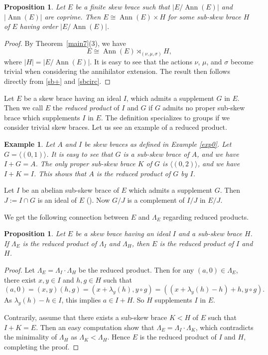 \documentclass[11pt]{amsart}
\theoremstyle{thrm}
\theoremstyle{plain}
\newtheorem{prop}[thm]{Proposition}
\newtheorem{example}[thm]{Example}
\theoremstyle{definition}
\newcommand{\Ann}{\operatorname{Ann} }
\numberwithin{equation}{section}
\begin{document}
\begin{prop}
	Let $E$ be a finite skew brace such that $|E / \Ann(E)|$ and $|\Ann(E)|$ are coprime. Then $E \cong \Ann(E) \times H$
	for some sub-skew brace $H$ of $E$ having order $|E / \Ann(E)|$.
\end{prop}

\begin{proof}
	By Theorem~\ref{main7}(3), we have 
	\[
	E \cong \Ann(E) \rtimes_{(\nu, \mu, \sigma)} H,
	\] 
	where $|H| = |E / \Ann(E)|$. It is easy to see that the actions $\nu$, $\mu$, and $\sigma$ become trivial when considering the annihilator extension. The result then follows directly from  \eqref{sb+} and \eqref{sbcirc}.
\end{proof}


Let $E$ be a skew brace having an ideal $I$, which admits a supplement $G$ in $E$.   Then we call $E$ the {\it reduced product} of $I$ and  $G$ if $G$ admits no proper sub-skew brace which supplements $I$ in $E$. The definition specializes to groups if we consider trivial skew braces.  Let us see an example of a reduced product. 
\begin{example}\label{exp1}
	Let $A$ and $I$  be skew braces  as defined in Example \ref{exp0}. Let $G = \langle (0,1) \rangle$. It is easy to see that $G$ is a sub-skew brace of $A$, and we have $I + G = A$. The only proper sub-skew brace $K$ of $G$ is $  \langle (0,2) \rangle$, and we have $I + K = I$. This shows that $A$ is the reduced product of $G$ by $I$.
\end{example}

Let $I$ be an abelian sub-skew brace of $E$ which admits a supplement $G$. Then $J := I \cap G$ is an ideal of $E$ (\cite[Lemma 28]{BEJP24}).  Now $G/J$ is a complement of $I/J$ in $E/J$. 

 We get the following connection between $E$ and $\Lambda_E$ regarding reduced products.

\begin{prop}
Let $E$ be a skew brace having an ideal $I$ and a sub-skew brace $H$. If $\Lambda_E$ is the reduced  product of $\Lambda_I$ and $\Lambda_H$, then $E$ is  the reduced product of $I$ and $H$.
\end{prop}
\begin{proof}
Let $\Lambda_E = \Lambda_I  \cdot  \Lambda_H$ be the reduced product.  Then for any $(a,0) \in \Lambda_E$,  there exist $x, y \in I$ and $h, g \in H$ such that
$$(a,0) = (x,y)(h,g) = (x + \lambda_y(h), y \circ g) = \left((x + \lambda_y(h) - h) + h, y \circ g\right).$$
As $\lambda_y(h) -h \in I$, this implies $a \in I + H$. So $H$ supplements $I$ in $E$.

Contrarily, assume that  there exists a sub-skew brace $K < H$  of $E$ such that $I + K = E$. Then an easy computation show that $\Lambda_E = \Lambda_I \cdot \Lambda_K$, which contradicts the minimality of $\Lambda_H$ as $\Lambda_K < \Lambda_H$. Hence $E$ is the reduced product of $I$ and $H$, completing the proof.
\end{proof}
\end{document}
